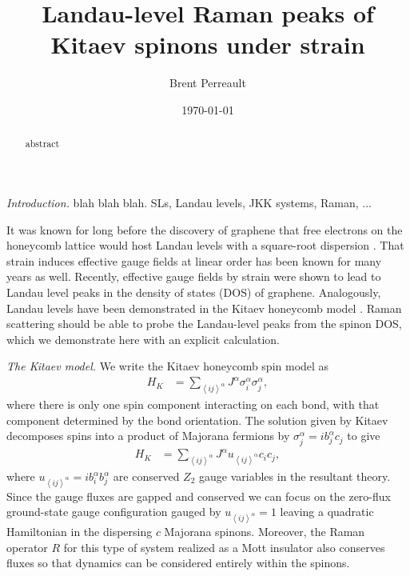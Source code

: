 \documentclass[reprint,amsmath,amssymb,aps,prl,groupedaddress,nofootinbib,superscriptaddress]{revtex4-1}
\newcommand{\1}{\mathds{1}}
\begin{document}
		
	\title{Landau-level Raman peaks of Kitaev spinons under strain  
		}
		\author{Brent Perreault}
%		
		\date{\today} 
		
		\begin{abstract}	
			abstract
		\end{abstract}
		
\maketitle		

\graphicspath{{Figures/}}

{\it Introduction.} 
blah blah blah. SLs, Landau levels, JKK systems, Raman, ...

It was known for long before the discovery of graphene that free electrons on the honeycomb lattice would host Landau levels with a square-root dispersion \cite{Rammal85}. That strain induces effective gauge fields at linear order has been known for many years as well. Recently, effective gauge fields by strain were shown to lead to Landau level peaks in the density of states (DOS) of graphene.\cite{Vozmediano10,...} Analogously, Landau levels have been demonstrated in the Kitaev honeycomb model \cite{Rachel15}. Raman scattering should be able to probe the Landau-level peaks from the spinon DOS, which we demonstrate here with an explicit calculation.



{\it The Kitaev model.} %
We write the Kitaev honeycomb spin model as\cite{Kitaev06}
\begin{align}\label{H}
{H}_K &= \sum_{\left<ij\right>^\alpha} J^\alpha \sigma^\alpha_i \sigma^\alpha_j ,
\end{align}
where there is only one spin component interacting on each bond, with that component determined by the bond orientation. The solution given by Kitaev decomposes spins into a product of Majorana fermions by $\sigma^\alpha_j = i b^\alpha_j c_j$ to give 
\begin{align}\label{H2}
{H}_K &= \sum_{\left<ij\right>^\alpha} J^\alpha u_{\left<ij\right>^\alpha} c_i c_j,
\end{align}
where $u_{\left<ij\right>^\alpha} = i b_i^\alpha b_j^\alpha$ are conserved $Z_2$ gauge variables in the resultant theory. Since the gauge fluxes are gapped and conserved we can focus on the zero-flux ground-state gauge configuration gauged by $u_{\left<ij\right>^\alpha} = 1$ leaving a quadratic Hamiltonian in the dispersing $c$ Majorana spinons. Moreover, the Raman operator $R$ for this type of system realized as a Mott insulator also conserves fluxes so that dynamics can be considered entirely within the spinons.
\end{document}
